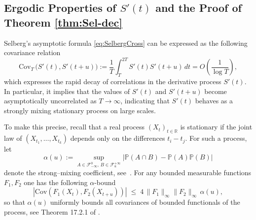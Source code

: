 \documentclass[12pt,reqno]{amsart}
\theoremstyle{plain}
\theoremstyle{definition}
\theoremstyle{remark}
\begin{document}
\subsection{Ergodic Properties of $S'(t)$ and the Proof of Theorem \ref{thm:Sel-dec}}
\label{ss:9.3} Selberg's asymptotic formula \eqref{eq:SelbergCross} can be expressed as the following covariance relation
\begin{equation}
\label{eq:CovT}
\mathrm{Cov}_T\, \bigl(S'(t),S'(t+u)\bigr)
:=\frac{1}{T}\int_T^{2T}\!S'(t)S'(t+u)\,dt
=O\!\left(\frac{1}{\log T}\right),
\end{equation}
which expresses the rapid decay of correlations in the derivative process \(S'(t)\).
In particular, it implies that the values of \(S'(t)\) and \(S'(t+u)\) become asymptotically uncorrelated as \(T\to\infty\),
indicating that \(S'(t)\) behaves as a strongly mixing stationary process on large scales.

To make this precise, recall that a real process $(X_t)_{t\in\mathbb{R}}$ is stationary if the joint law of
$(X_{t_1},\ldots,X_{t_k})$ depends only on the differences $t_i-t_j$.
For such a process, let
\begin{equation}
\alpha(u)
:=\sup_{A\in\mathcal{F}_{-\infty}^0,\,B\in\mathcal{F}_u^{+\infty}}
\bigl|\mathbb{P}(A\cap B)-\mathbb{P}(A)\mathbb{P}(B)\bigr|
\end{equation}
denote the strong--mixing coefficient, see~\cite{Rosenblatt1956}.
For any bounded measurable functions $F_1,F_2$ one has the following $\alpha$-bound 
\begin{equation}\label{eq:IL-bound}
|\mathrm{Cov}(F_1(X_t),F_2(X_{t+u}))|
\;\le\;
4\,\|F_1 \|_{\infty}\|F_2 \|_{\infty}\,\alpha(u),
\end{equation} 
so that $\alpha(u)$ uniformly bounds all covariances of bounded functionals of the process, see Theorem 17.2.1 of \cite{IbragimovLinnik1971}.
\end{document}

